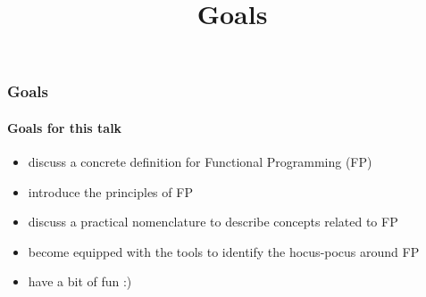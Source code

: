 {


  \begin{frame}[plain] 
  \title{Goals}
  
  \vspace{3em}

  \begin{TitleBoxGoals}
    \begin{center}
    {\Large \inserttitle}
    \end{center}
  \end{TitleBoxGoals}

  \end{frame}
}


\begin{frame}
\frametitle{Goals}
\framesubtitle{Goals for this talk}
\begin{center}

\begin{itemize}
  \item<1-> discuss a concrete definition for Functional Programming (FP)
  \item<2-> introduce the principles of FP
  \item<3-> discuss a practical nomenclature to describe concepts related to FP
  \item<4-> become equipped with the tools to identify the hocus-pocus around FP
  \item<5-> have a bit of fun :)
\end{itemize}


\end{center}
\end{frame}

